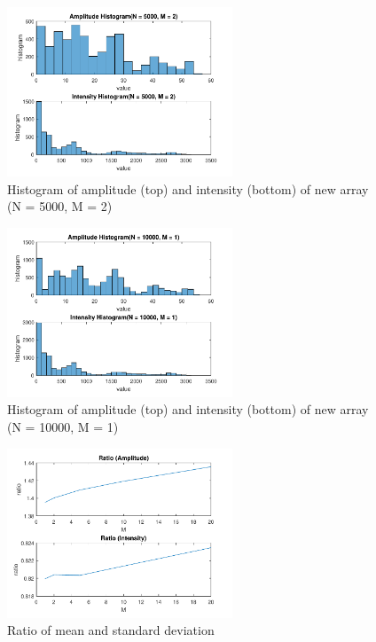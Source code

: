 \documentclass{article}
\begin{document}
\begin{figure}[H]
	\centering
	\includegraphics[width = 0.6\textwidth]{src/2pi/hist_5000_2.pdf}
	\caption{Histogram of amplitude (top) and intensity (bottom) of new array (N = 5000, M = 2)}
	\label{fig:hist-5000-2}
\end{figure}
\begin{figure}[H]
	\centering
	\includegraphics[width = 0.6\textwidth]{src/2pi/hist_10000_1.pdf}
	\caption{Histogram of amplitude (top) and intensity (bottom) of new array (N = 10000, M = 1)}
	\label{fig:hist-10000-1}
\end{figure}

\begin{figure}[H]
	\centering
	\includegraphics[width = 0.6\textwidth]{src/2pi/ratio.pdf}
	\caption{Ratio of mean and standard deviation}
	\label{fig:ratio}
\end{figure}
\end{document}
